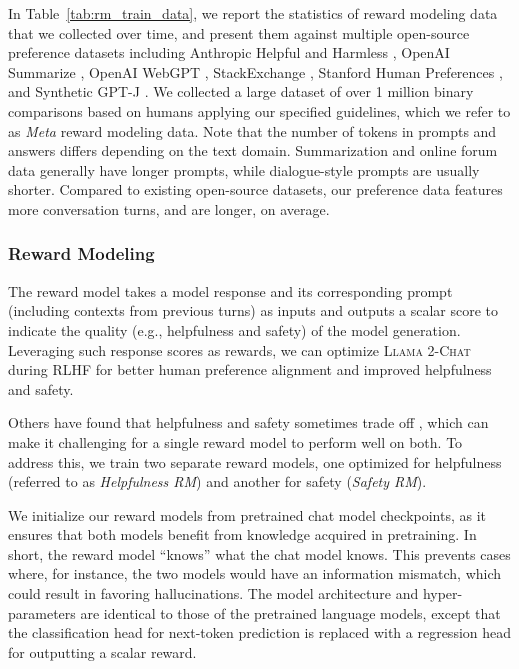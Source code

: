 \documentclass{article}
\newcommand{\modelname}{\textsc{Llama 2-Chat}\xspace}
\begin{document}
In Table~\ref{tab:rm_train_data}, we report the statistics of reward modeling data that we collected over time, and present them against multiple open-source preference datasets including Anthropic Helpful and Harmless \citep{bai2022training}, OpenAI Summarize \citep{stienon2020learning}, OpenAI WebGPT \citep{nakano2021webgpt}, StackExchange \citep{h4stackexchange}, Stanford Human Preferences \citep{SHP},
and Synthetic GPT-J \citep{synthetic_gptj}. 
We collected a large dataset of over 1 million binary comparisons based on humans applying our specified guidelines, which we refer to as \emph{Meta} reward modeling data. 
Note that the number of tokens in prompts and answers differs depending on the text domain. 
Summarization and online forum data generally have longer prompts, while dialogue-style prompts are usually shorter. 
Compared to existing open-source datasets, our preference data features more conversation turns, and are longer, on average.

\subsubsection{Reward Modeling}
\label{subsec:reward_modeling}

The reward model takes a model response and its corresponding prompt (including contexts from previous turns) as inputs and outputs a scalar score to indicate the quality (e.g., helpfulness and safety) of the model generation. Leveraging such response scores as rewards, we can optimize \modelname during RLHF for better human preference alignment and improved helpfulness and safety. 

Others have found that helpfulness and safety sometimes trade off \citep{bai2022training}, which can make it challenging for a single reward model to perform well on both. 
To address this, we train two separate reward models, one optimized for helpfulness (referred to as \textit{Helpfulness RM}) and another for safety (\textit{Safety RM}).

We initialize our reward models from pretrained chat model checkpoints, as it ensures that both models benefit from knowledge acquired in pretraining. 
In short, the reward model ``knows'' what the chat model knows. This prevents cases where, for instance, the two models would have an information mismatch, which could result in favoring hallucinations. 
The model architecture and hyper-parameters are identical to those of the pretrained language models, except that the classification head for next-token prediction is replaced with a regression head for outputting a scalar reward. 
\end{document}
